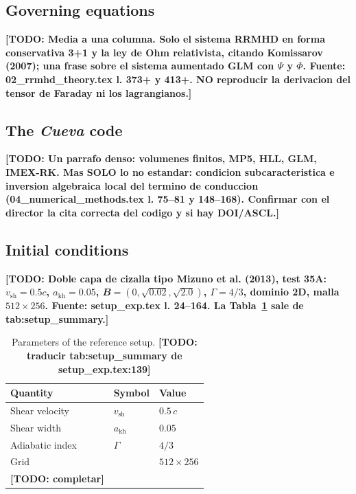\documentclass[fleqn,usenatbib]{mnras}
\newcommand{\akh}{a_{\mathrm{kh}}}
\newcommand{\vsh}{v_{\mathrm{sh}}}
\newcommand{\B}{\mathbfit{B}}      %
\newcommand{\todo}[1]{\textbf{[TODO: #1]}}
\begin{document}
\subsection{Governing equations}
\label{sec:equations}

\todo{Media a una columna. Solo el sistema RRMHD en forma conservativa 3+1 y la
ley de Ohm relativista, citando Komissarov (2007); una frase sobre el sistema
aumentado GLM con $\Psi$ y $\Phi$. Fuente: 02\_rrmhd\_theory.tex l. 373+ y 413+.
NO reproducir la derivacion del tensor de Faraday ni los lagrangianos.}

\subsection{The \textit{Cueva} code}
\label{sec:code}

\todo{Un parrafo denso: volumenes finitos, MP5, HLL, GLM, IMEX-RK. Mas SOLO lo
no estandar: condicion subcaracteristica e inversion algebraica local del
termino de conduccion (04\_numerical\_methods.tex l. 75--81 y 148--168).
Confirmar con el director la cita correcta del codigo y si hay DOI/ASCL.}

\subsection{Initial conditions}
\label{sec:ic}

\todo{Doble capa de cizalla tipo Mizuno et al. (2013), test 35A:
$\vsh=0.5c$, $\akh=0.05$, $\B=(0,\sqrt{0.02},\sqrt{2.0})$, $\Gamma=4/3$,
dominio 2D, malla $512\times256$. Fuente: setup\_exp.tex l. 24--164.
La Tabla~\ref{tab:setup} sale de tab:setup\_summary.}

\begin{table}
  \centering
  \caption{Parameters of the reference setup.
           \todo{traducir tab:setup\_summary de setup\_exp.tex:139}}
  \label{tab:setup}
  \begin{tabular}{lll}
    \hline
    Quantity & Symbol & Value \\
    \hline
    Shear velocity     & $\vsh$  & $0.5\,c$ \\
    Shear width        & $\akh$  & $0.05$ \\
    Adiabatic index    & $\Gamma$ & $4/3$ \\
    Grid               &          & $512\times256$ \\
    \todo{completar}   &          & \\
    \hline
  \end{tabular}
\end{table}
\end{document}
